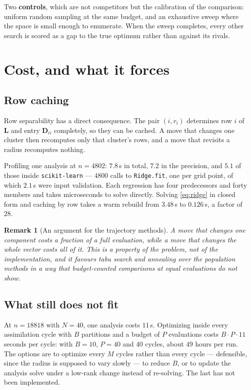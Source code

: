 \documentclass[11pt,a4paper]{article}
\newtheorem{remark}{Remark}
\theoremstyle{definition}
\newcommand{\Lmat}{\mathbf{L}}
\newcommand{\Dmat}{\mathbf{D}}
\begin{document}
\noindent
Two \textbf{controls}, which are not competitors but the calibration of the
comparison: uniform random sampling at the same budget, and an exhaustive sweep
where the space is small enough to enumerate. When the sweep completes, every
other search is scored as a gap to the true optimum rather than against its
rivals.

\section{Cost, and what it forces}

\subsection{Row caching}

Row separability has a direct consequence. The pair $(i, r_i)$ determines row
$i$ of $\Lmat$ and entry $\Dmat_{ii}$ completely, so they can be cached. A move
that changes one cluster then recomputes only that cluster's rows, and a move
that revisits a radius recomputes nothing.

Profiling one analysis at $n = 4802$: $7.8$\,s in total, $7.2$ in the precision,
and $5.1$ of those inside \texttt{scikit-learn} --- $4800$ calls to
\texttt{Ridge.fit}, one per grid point, of which $2.1$\,s were input validation.
Each regression has four predecessors and forty members and takes microseconds
to solve directly. Solving \eqref{eq:ridge} in closed form and caching by row
takes a warm rebuild from $3.48$\,s to $0.126$\,s, a factor of $28$.

\begin{remark}[An argument for the trajectory methods]
A move that changes one component costs a fraction of a full evaluation, while
a move that changes the whole vector costs all of it. This is a property of the
problem, not of the implementation, and it favours tabu search and annealing
over the population methods in a way that budget-counted comparisons at equal
\emph{evaluations} do not show.
\end{remark}

\subsection{What still does not fit}

At $n = 18818$ with $N = 40$, one analysis costs $11$\,s. Optimizing inside
every assimilation cycle with $B$ partitions and a budget of $P$ evaluations
costs $B \cdot P \cdot 11$ seconds per cycle: with $B = 10$, $P = 40$ and $40$
cycles, about $49$ hours per run. The options are to optimize every $M$ cycles
rather than every cycle --- defensible, since the radius is supposed to vary
slowly --- to reduce $B$, or to update the analysis solve under a low-rank
change instead of re-solving. The last has not been implemented.
\end{document}

